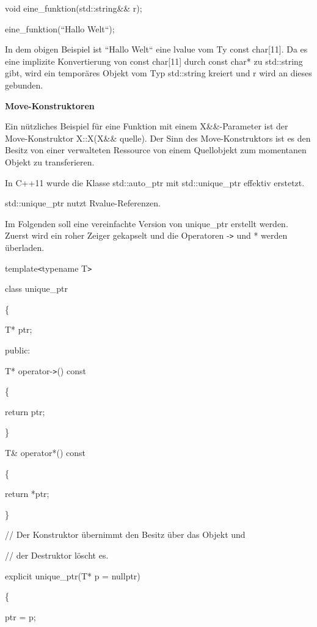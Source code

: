 \documentclass{article}
\begin{document}
void eine\_funktion(std::string\&\& r);

eine\_funktion(``Hallo Welt``);

In dem obigen Beispiel ist ``Hallo Welt`` eine lvalue vom Ty const char[11]. Da 
es eine implizite Konvertierung von const char[11] durch const char* zu std::string 
gibt, wird ein temporäres Objekt vom Typ std::string kreiert und r wird an dieses 
gebunden.

\vspace{12pt}
\textbf{Move-Konstruktoren}

Ein nützliches Beispiel für eine Funktion mit einem X\&\&-Parameter ist der Move-Konstruktor 
X::X(X\&\& quelle). Der Sinn des Move-Konstruktors ist es den Besitz von einer 
verwalteten Ressource von einem Quellobjekt zum momentanen Objekt zu transferieren.

In C++11 wurde die Klasse std::auto\_ptr mit std::unique\_ptr effektiv erstetzt.

std::unique\_ptr nutzt Rvalue-Referenzen.

Im Folgenden soll eine vereinfachte Version von unique\_ptr erstellt werden. Zuerst 
wird ein roher Zeiger gekapselt und die Operatoren -\texttt{>} und * werden überladen.

template\texttt{<}typename T\texttt{>}

class unique\_ptr

\{    

\parindent=14pt
T* ptr;

\vspace{12pt}
\parindent=0pt
public:    

\parindent=14pt
T* operator-\texttt{>}() const    

\{        

\parindent=43pt
return ptr;    

\parindent=14pt
\}    

\vspace{12pt}
T\& operator*() const    

\parindent=28pt
\{        

return *ptr;    

\parindent=43pt
\}

\parindent=0pt
// Der Konstruktor übernimmt den Besitz über das Objekt und

// der Destruktor löscht es.    

\parindent=14pt
explicit unique\_ptr(T* p = nullptr)    

\{        

\parindent=43pt
ptr = p;    
\end{document}
